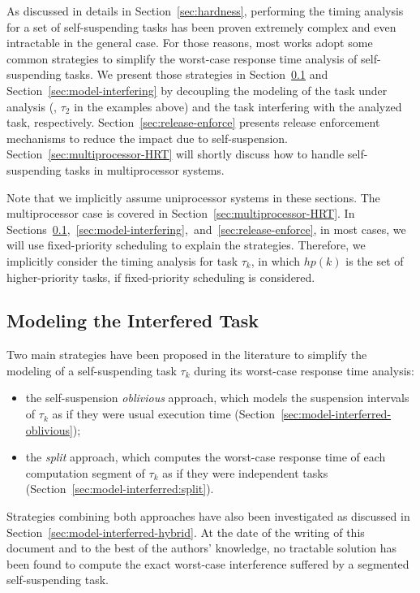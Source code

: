 As discussed in details in Section~\ref{sec:hardness}, performing the timing analysis for a set of self-suspending tasks has been proven extremely complex and even intractable in the general case. For those reasons, most works adopt some common strategies to simplify the worst-case response time analysis of self-suspending tasks. We present those strategies in Section~\ref{sec:model-interferred} and Section~\ref{sec:model-interfering} by decoupling the modeling of the task under analysis (\ie, $\tau_2$ in the examples above) and the task interfering with the analyzed task, respectively. Section~\ref{sec:release-enforce} presents  release enforcement mechanisms to reduce the impact due to self-suspension. Section~\ref{sec:multiprocessor-HRT} will shortly discuss how to handle self-suspending tasks in multiprocessor systems.


Note that we implicitly assume uniprocessor systems in these sections. The multiprocessor case is covered in Section~\ref{sec:multiprocessor-HRT}. In Sections~\ref{sec:model-interferred},~\ref{sec:model-interfering},~and~\ref{sec:release-enforce}, in most cases, we will use fixed-priority scheduling to explain the strategies. Therefore, we implicitly consider the timing analysis for task $\tau_k$, in which $hp(k)$ is the set of higher-priority tasks, if fixed-priority scheduling is considered.

\subsection{Modeling the Interfered Task}
\label{sec:model-interferred}

Two main strategies have been proposed in the literature to simplify the modeling of a self-suspending task $\tau_k$ during its worst-case response time analysis:
\begin{itemize}
\item the self-suspension \emph{oblivious} approach, which models the suspension intervals of $\tau_k$ as if they were usual execution time (Section~\ref{sec:model-interferred-oblivious});
\item the \emph{split} approach, which computes the worst-case response time of each computation segment of $\tau_k$ as if they were independent tasks (Section~\ref{sec:model-interferred:split}).
\end{itemize}
Strategies combining both approaches have also been investigated as discussed in Section~\ref{sec:model-interferred-hybrid}.
At the date of the writing of this document and to the best of the authors' knowledge, no tractable solution has been found to compute the exact worst-case interference suffered by a segmented self-suspending task. 




